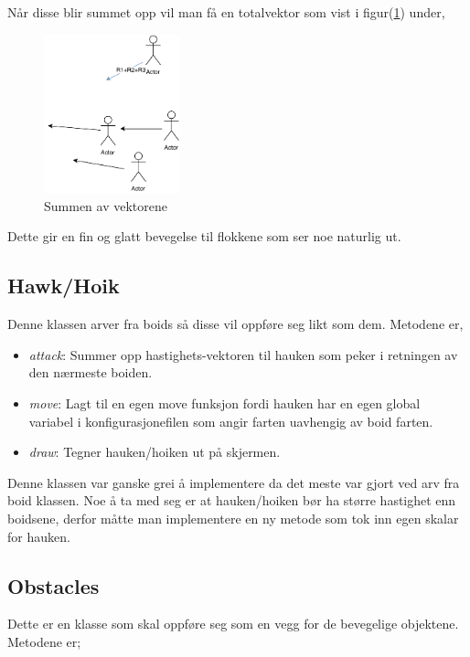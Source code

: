 {Når disse blir summet opp vil man få en totalvektor som vist i figur(\ref{sumvektor}) under,

\begin{figure}[hbt!]
{\centering
    \includegraphics[width=0.35\textwidth]{rulelast.pdf}
    \caption{Summen av vektorene}
    \label{sumvektor}
\par}
\end{figure}

Dette gir en fin og glatt bevegelse til flokkene som ser noe naturlig ut.


\subsection{Hawk/Hoik}

Denne klassen arver fra boids så disse vil oppføre seg likt som dem. Metodene er,

\begin{itemize}
    \item \emph{attack}: Summer opp hastighets-vektoren til hauken som peker i retningen av den nærmeste boiden.
    \item \emph{move}: Lagt til en egen move funksjon fordi hauken har en egen global variabel i konfigurasjonefilen som angir farten uavhengig av boid farten.
    \item \emph{draw}: Tegner hauken/hoiken ut på skjermen.
\end{itemize}


Denne klassen var ganske grei å implementere da det meste var gjort ved arv fra boid klassen.
Noe å ta med seg er at hauken/hoiken bør ha større hastighet enn boidsene, derfor måtte man implementere en ny metode som tok inn egen skalar for hauken.



\subsection{Obstacles}
Dette er en klasse som skal oppføre seg som en vegg for de bevegelige objektene. Metodene er;

}
